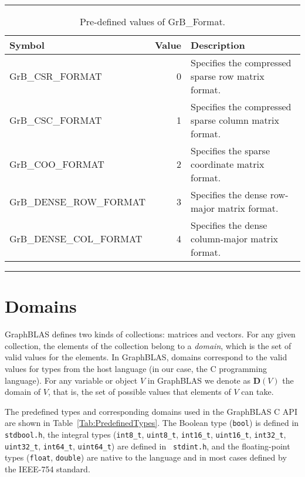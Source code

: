 \begin{table}[bh]
\hrule
\begin{center}
\caption{Pre-defined values of {\sf GrB\_Format}.}
\label{Tab:GrB_Format}
\begin{tabular}{l|r|p{3in}}
Symbol    & Value & Description \\ \hline
{\sf GrB\_CSR\_FORMAT} & 0 & Specifies the compressed sparse row matrix format.\\
\hline
{\sf GrB\_CSC\_FORMAT} & 1 & Specifies the compressed sparse column matrix format.\\
\hline
{\sf GrB\_COO\_FORMAT} & 2 & Specifies the sparse coordinate matrix format.\\
\hline
{\sf GrB\_DENSE\_ROW\_FORMAT} & 3 & Specifies the dense row-major matrix format.\\
\hline
{\sf GrB\_DENSE\_COL\_FORMAT} & 4 & Specifies the dense column-major matrix format.\\
\end{tabular}
\end{center}
\hrule
\end{table}

\section{Domains}

GraphBLAS defines two kinds of collections: matrices and vectors.
For any given collection, the elements of the collection belong to
a \emph{domain}, which is the set of valid values for the elements.
In GraphBLAS, domains correspond to the valid values for types from the
host language (in our case, the C programming language).  For any variable
or object $V$ in GraphBLAS we denote as $\mathbf{D}(V)$ the domain of $V$,
that is, the set of possible values that elements of $V$ can take.

The predefined types and corresponding domains used in the GraphBLAS C API are
shown in Table~\ref{Tab:PredefinedTypes}.  The Boolean type ({\tt bool})
is defined in {\tt stdbool.h}, the integral types ({\tt int8\_t},
{\tt uint8\_t}, {\tt int16\_t}, {\tt uint16\_t}, {\tt int32\_t},
{\tt uint32\_t}, {\tt int64\_t}, {\tt uint64\_t}) are defined in {\tt
stdint.h}, and the floating-point types ({\tt float}, {\tt double}) are
native to the language and in most cases defined by the IEEE-754 standard.

